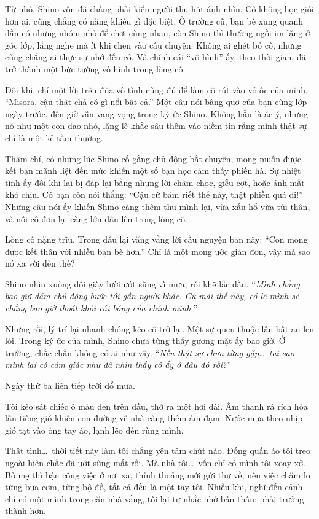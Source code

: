 \documentclass[../main.tex]{subfiles}
\begin{document}
Từ nhỏ, Shino vốn đã chẳng phải kiểu người thu hút ánh nhìn. Cô không học giỏi hơn ai, cũng chẳng có năng khiếu gì đặc biệt. Ở trường cũ, bạn bè xung quanh dần có những nhóm nhỏ để chơi cùng nhau, còn Shino thì thường ngồi im lặng ở góc lớp, lắng nghe mà ít khi chen vào câu chuyện. Không ai ghét bỏ cô, nhưng cũng chẳng ai thực sự nhớ đến cô. Và chính cái ``vô hình'' ấy, theo thời gian, đã trở thành một bức tường vô hình trong lòng cô.

Đôi khi, chỉ một lời trêu đùa vô tình cũng đủ để làm cô rút vào vỏ ốc của mình. ``Misora, cậu thật chả có gì nổi bật cả.'' Một câu nói bâng quơ của bạn cùng lớp ngày trước, đến giờ vẫn vang vọng trong ký ức Shino. Không hẳn là ác ý, nhưng nó như một con dao nhỏ, lặng lẽ khắc sâu thêm vào niềm tin rằng mình thật sự chỉ là một kẻ tầm thường.

Thậm chí, có những lúc Shino cố gắng chủ động bắt chuyện, mong muốn được kết bạn mãnh liệt đến mức khiến một số bạn học cảm thấy phiền hà. Sự nhiệt tình ấy đôi khi lại bị đáp lại bằng những lời châm chọc, giễu cợt, hoặc ánh mắt khó chịu. Có bạn còn nói thẳng: ``Cậu cứ bám riết thế này, thật phiền quá đi!'' Những câu nói ấy khiến Shino càng thêm thu mình lại, vừa xấu hổ vừa tủi thân, và nỗi cô đơn lại càng lớn dần lên trong lòng cô.

Lòng cô nặng trĩu. Trong đầu lại văng vẳng lời cầu nguyện ban nãy: ``Con mong được kết thân với nhiều bạn bè hơn.'' Chỉ là một mong ước giản đơn, vậy mà sao nó xa vời đến thế?

Shino nhìn xuống đôi giày lười ướt sũng vì mưa, rồi khẽ lắc đầu. ``\textit{Mình chẳng bao giờ dám chủ động bước tới gần người khác. Cứ mãi thế này, có lẽ mình sẽ chẳng bao giờ thoát khỏi cái bóng của chính mình.}''

Nhưng rồi, lý trí lại nhanh chóng kéo cô trở lại. Một sự quen thuộc lẫn bất an len lỏi. Trong ký ức của mình, Shino chưa từng thấy gương mặt ấy bao giờ. Ở trường, chắc chắn không có ai như vậy. ``\textit{Nếu thật sự chưa từng gặp\dots\ tại sao mình lại có cảm giác như đã nhìn thấy cô ấy ở đâu đó rồi?}''


Ngày thứ ba liên tiếp trời đổ mưa.

Tôi kéo sát chiếc ô màu đen trên đầu, thở ra một hơi dài. Âm thanh rả rích hòa lẫn tiếng gió khiến con đường về nhà càng thêm ảm đạm. Nước mưa theo nhịp gió tạt vào ống tay áo, lạnh lẽo đến rùng mình.

Thật tình\dots\ thời tiết này làm tôi chẳng yên tâm chút nào. Đống quần áo tôi treo ngoài hiên chắc đã ướt sũng mất rồi. Mà nhà tôi\dots\ vốn chỉ có mình tôi xoay xở. Bố mẹ thì bận công việc ở nơi xa, thỉnh thoảng mới gửi thư về, nên việc chăm lo từng bữa cơm, từng bộ đồ, tất cả đều là một tay tôi. Nhiều khi, nghĩ đến cảnh chỉ có một mình trong căn nhà vắng, tôi lại tự nhắc nhở bản thân: phải trưởng thành hơn.
\end{document}
